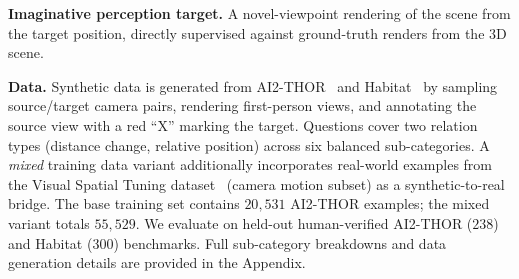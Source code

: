 \documentclass{llmxive}
\begin{document}
\noindent\textbf{Imaginative perception target.} A novel-viewpoint rendering of the scene from the target position, directly supervised against ground-truth renders from the 3D scene.

\noindent\textbf{Data.}
Synthetic data is generated from AI2-THOR~\cite{kolve2017ai2} and Habitat~\cite{habitat19iccv,szot2021habitat,puig2023habitat3} by sampling source/target camera pairs, rendering first-person views, and annotating the source view with a red ``X'' marking the target.
Questions cover two relation types (distance change, relative position) across six balanced sub-categories.
A \emph{mixed} training data variant additionally incorporates real-world examples from the Visual Spatial Tuning dataset~\cite{yang2025visual} (camera motion subset) as a synthetic-to-real bridge.
The base training set contains $20{,}531$ AI2-THOR examples; the mixed variant totals $55{,}529$.
We evaluate on held-out human-verified AI2-THOR ($238$) and Habitat ($300$) benchmarks.
Full sub-category breakdowns and data generation details are provided in the Appendix.


\end{document}
